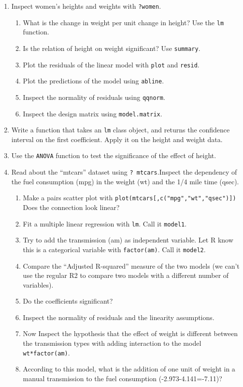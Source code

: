\documentclass[]{book}
\providecommand{\tightlist}{%
  \setlength{\itemsep}{0pt}\setlength{\parskip}{0pt}}
\theoremstyle{definition}
\theoremstyle{definition}
\theoremstyle{definition}
\theoremstyle{remark}
\begin{document}
\begin{enumerate}
\def\labelenumi{\arabic{enumi}.}
\item
  Inspect women's heights and weights with \texttt{?women}.

  \begin{enumerate}
  \def\labelenumii{\arabic{enumii}.}
  \tightlist
  \item
    What is the change in weight per unit change in height? Use the
    \texttt{lm} function.
  \item
    Is the relation of height on weight significant? Use
    \texttt{summary}.
  \item
    Plot the residuals of the linear model with \texttt{plot} and
    \texttt{resid}.
  \item
    Plot the predictions of the model using \texttt{abline}.
  \item
    Inspect the normality of residuals using \texttt{qqnorm}.
  \item
    Inspect the design matrix using \texttt{model.matrix}.
  \end{enumerate}
\item
  Write a function that takes an \texttt{lm} class object, and returns
  the confidence interval on the first coefficient. Apply it on the
  height and weight data.
\item
  Use the \texttt{ANOVA} function to test the significance of the effect
  of height.
\item
  Read about the ``mtcars'' dataset using \texttt{?\ mtcars}.Inspect the
  dependency of the fuel consumption (mpg) in the weight (wt) and the
  1/4 mile time (qsec).

  \begin{enumerate}
  \def\labelenumii{\arabic{enumii}.}
  \tightlist
  \item
    Make a pairs scatter plot with
    \texttt{plot(mtcars{[},c("mpg","wt","qsec"){]})} Does the connection
    look linear?
  \item
    Fit a multiple linear regression with \texttt{lm}. Call it
    \texttt{model1}.
  \item
    Try to add the transmission (am) as independent variable. Let R know
    this is a categorical variable with \texttt{factor(am)}. Call it
    \texttt{model2}.
  \item
    Compare the ``Adjusted R-squared'' measure of the two models (we
    can't use the regular R2 to compare two models with a different
    number of variables).
  \item
    Do the coefficients significant?
  \item
    Inspect the normality of residuals and the linearity assumptions.
  \item
    Now Inspect the hypothesis that the effect of weight is different
    between the transmission types with adding interaction to the model
    \texttt{wt*factor(am)}.
  \item
    According to this model, what is the addition of one unit of weight
    in a manual transmission to the fuel consumption
    (-2.973-4.141=-7.11)?
  \end{enumerate}
\end{enumerate}
\end{document}
